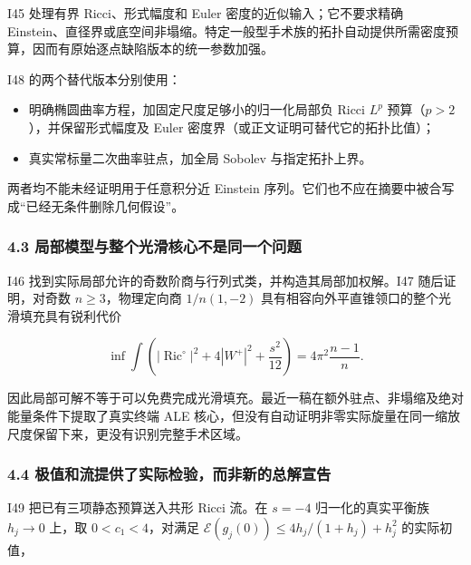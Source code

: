 \documentclass[
  10pt,
]{article}
\providecommand{\tightlist}{%
  \setlength{\itemsep}{0pt}\setlength{\parskip}{0pt}}
\begin{document}
I45 处理有界 Ricci、形式幅度和 Euler 密度的近似输入；它不要求精确
Einstein、直径界或底空间非塌缩。特定一般型手术族的拓扑自动提供所需密度预算，因而有原始逐点缺陷版本的统一参数加强。

I48 的两个替代版本分别使用：

\begin{itemize}
\tightlist
\item
  明确椭圆曲率方程，加固定尺度足够小的归一化局部负 Ricci \(L^p\)
  预算（\(p>2\)），并保留形式幅度及 Euler
  密度界（或正文证明可替代它的拓扑比值）；
\item
  真实常标量二次曲率驻点，加全局 Sobolev 与指定拓扑上界。
\end{itemize}

两者均不能未经证明用于任意积分近 Einstein
序列。它们也不应在摘要中被合写成``已经无条件删除几何假设''。

\hypertarget{ux5c40ux90e8ux6a21ux578bux4e0eux6574ux4e2aux5149ux6ed1ux6838ux5fc3ux4e0dux662fux540cux4e00ux4e2aux95eeux9898}{%
\subsubsection{4.3
局部模型与整个光滑核心不是同一个问题}\label{ux5c40ux90e8ux6a21ux578bux4e0eux6574ux4e2aux5149ux6ed1ux6838ux5fc3ux4e0dux662fux540cux4e00ux4e2aux95eeux9898}}

I46 找到实际局部允许的奇数阶商与行列式类，并构造其局部加权解。I47
随后证明，对奇数 \(n\ge3\)，物理定向商 \(1/n(1,-2)\)
具有相容向外平直锥领口的整个光滑填充具有锐利代价

\[
\inf\int\left(|\operatorname{Ric}^{\circ}|^2+
4|W^+|^2+\frac{s^2}{12}\right)=4\pi^2\frac{n-1}{n}.
\]

因此局部可解不等于可以免费完成光滑填充。最近一稿在额外驻点、非塌缩及绝对能量条件下提取了真实终端
ALE
核心，但没有自动证明非零实际旋量在同一缩放尺度保留下来，更没有识别完整手术区域。

\hypertarget{ux6781ux503cux548cux6d41ux63d0ux4f9bux4e86ux5b9eux9645ux68c0ux9a8cux800cux975eux65b0ux7684ux603bux89e3ux5ba3ux544a}{%
\subsubsection{4.4
极值和流提供了实际检验，而非新的总解宣告}\label{ux6781ux503cux548cux6d41ux63d0ux4f9bux4e86ux5b9eux9645ux68c0ux9a8cux800cux975eux65b0ux7684ux603bux89e3ux5ba3ux544a}}

I49 把已有三项静态预算送入共形 Ricci 流。在 \(s=-4\) 归一化的真实平衡族
\(h_j\to0\) 上，取 \(0<c_1<4\)，对满足
\(\mathcal E(g_j(0))\le4h_j/(1+h_j)+h_j^2\) 的实际初值，
\end{document}
